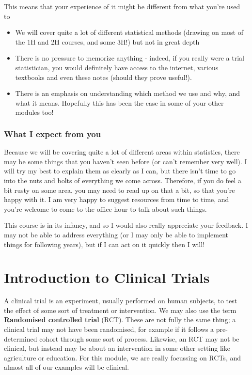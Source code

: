 \documentclass[
  openany]{book}
\providecommand{\tightlist}{%
  \setlength{\itemsep}{0pt}\setlength{\parskip}{0pt}}
\theoremstyle{definition}
\theoremstyle{definition}
\theoremstyle{definition}
\theoremstyle{definition}
\theoremstyle{remark}
\begin{document}
This means that your experience of it might be different from what you're used to

\begin{itemize}
\tightlist
\item
  We will cover quite a lot of different statistical methods (drawing on most of the 1H and 2H courses, and some 3H!) but not in great depth
\item
  There is no pressure to memorize anything - indeed, if you really were a trial statistician, you would definitely have access to the internet, various textbooks and even these notes (should they prove useful!).
\item
  There is an emphasis on understanding which method we use and why, and what it means. Hopefully this has been the case in some of your other modules too!
\end{itemize}

\subsection*{What I expect from you}\label{what-i-expect-from-you}

Because we will be covering quite a lot of different areas within statistics, there may be some things that you haven't seen before (or can't remember very well). I will try my best to explain them as clearly as I can, but there isn't time to go into the nuts and bolts of everything we come across. Therefore, if you do feel a bit rusty on some area, you may need to read up on that a bit, so that you're happy with it. I am very happy to suggest resources from time to time, and you're welcome to come to the office hour to talk about such things.

This course is in its infancy, and so I would also really appreciate your feedback. I may not be able to address everything (or I may only be able to implement things for following years), but if I can act on it quickly then I will!

\chapter{Introduction to Clinical Trials}\label{rct-intro}

A clinical trial is an experiment, usually performed on human subjects, to test the effect of some sort of treatment or intervention. We may also use the term \textbf{Randomised controlled trial} (RCT). These are not fully the same thing; a clinical trial may not have been randomised, for example if it follows a pre-determined cohort through some sort of process. Likewise, an RCT may not be clinical, but instead may be about an intervention in some other setting like agriculture or education. For this module, we are really focussing on RCTs, and almost all of our examples will be clinical.
\end{document}
